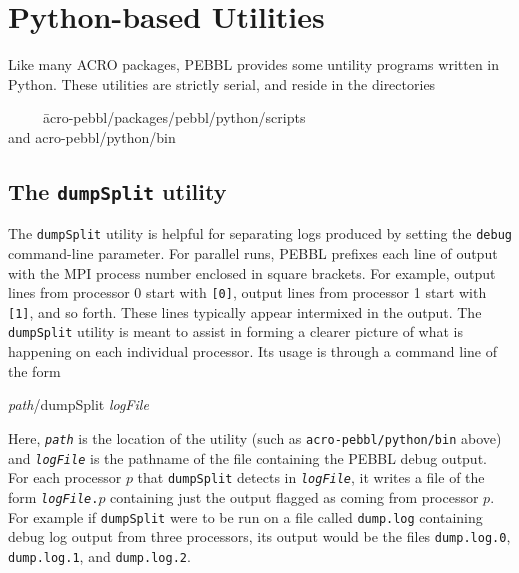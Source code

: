 \section{Python-based Utilities}
\label{sec:pythonutils}
Like many ACRO packages, PEBBL provides some untility programs written in
Python.  These utilities are strictly serial, and reside in the
directories
\begin{codeblock}
~~~~~\=acro-pebbl/packages/pebbl/python/scripts \\
\textrm{and} \>acro-pebbl/python/bin
\end{codeblock}


\subsection{The \texttt{dumpSplit} utility}
\label{sec:dumpsplit}
The \texttt{dumpSplit} utility is helpful for separating logs produced
by setting the \texttt{debug} command-line parameter.  For parallel
runs, PEBBL prefixes each line of output with the MPI process number
enclosed in square brackets.  For example, output lines from processor
0 start with \texttt{[0]}, output lines from processor 1 start with
\texttt{[1]}, and so forth.  These lines typically appear intermixed
in the output.  The \texttt{dumpSplit} utility is meant to assist in
forming a clearer picture of what is happening on each individual
processor.  Its usage is through a command line of the form
\begin{codeblock}
\textit{path}/dumpSplit \textit{logFile}
\end{codeblock}
Here, \texttt{\textit{path}} is the location of the utility (such as
\texttt{acro-pebbl/python/bin} above) and \texttt{\textit{logFile}} is
the pathname of the file containing the PEBBL debug output.  For each
processor $p$ that \texttt{dumpSplit} detects in
\texttt{\textit{logFile}}, it writes a file of the form
\texttt{\textit{logFile}.$p$} containing just the output flagged as
coming from processor $p$.  For example if \texttt{dumpSplit} were to
be run on a file called \texttt{dump.log} containing debug log output
from three processors, its output would be the files
\texttt{dump.log.0}, \texttt{dump.log.1}, and \texttt{dump.log.2}.


